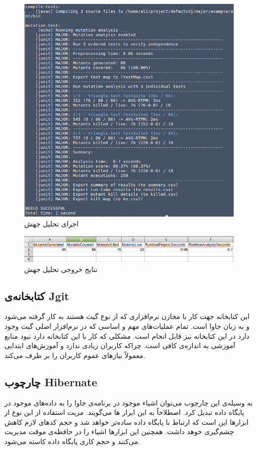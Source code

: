 \begin{enumerate}
 \begin{figure}[H]
 	\centering
 	\includegraphics[width=.8\textwidth]{img/case_study/major-analysis.png}
 	\caption{اجرای تحلیل جهش}
 	\label{fig:major-analysis}
 \end{figure}
 
 \begin{figure}[H]
 	\centering
 	\includegraphics[width=.8\textwidth]{img/case_study/major-results.png}
 	\caption{نتایج خروجی تحلیل جهش}
 	\label{fig:major-results}
 \end{figure}

\end{enumerate}


\subsection{کتابخانه‌ی Jgit}
این کتابخانه جهت کار با مخازن نرم‌افزاری  که از نوع گیت هستند به کار گرفته می‌شود و به زبان جاوا است. تمام عملیات‌های مهم و اساسی که در نرم‌افزار اصلی گیت وجود دارد در این کتابخانه نیز قابل انجام است. مشکلی که کار با این کتابخانه دارد نبود منابع آموزشی به اندازه‌ی کافی است. چراکه کاربران زیادی ندارد و آموزش‌های ابتدایی معمولاً نیازهای عموم کاربران را بر طرف می‌کند. 
\subsection{چارچوب Hibernate }
به وسیله‌ی این چارچوب می‌توان  اشیاء موجود در برنامه‌ی جاوا را به داده‌های موجود در پایگاه داده تبدیل کرد. اصطلاحاً به این ابزار ها  می‌گویند. مزیت استفاده از این نوع از ابزارها این است که ارتباط با پایگاه داده ساده‌تر خواهد شد و حجم کدهای لازم کاهش چشم‌گیری خوهد داشت. همچنین این ابزارها اشیاء را در حافظه‌ی موقت مدیریت می‌کنند و حجم کاری پایگاه داده کاسته می‌شود. 